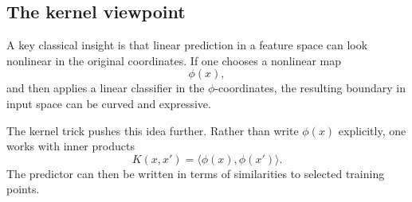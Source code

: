 
\subsection*{The kernel viewpoint}

A key classical insight is that linear prediction in a feature space can look nonlinear in the original coordinates. If one chooses a nonlinear map
\[
\phi(x),
\]
and then applies a linear classifier in the $\phi$-coordinates, the resulting boundary in input space can be curved and expressive.

The kernel trick pushes this idea further. Rather than write $\phi(x)$ explicitly, one works with inner products
\[
K(x,x') = \langle \phi(x),\phi(x')\rangle.
\]
The predictor can then be written in terms of similarities to selected training points.

